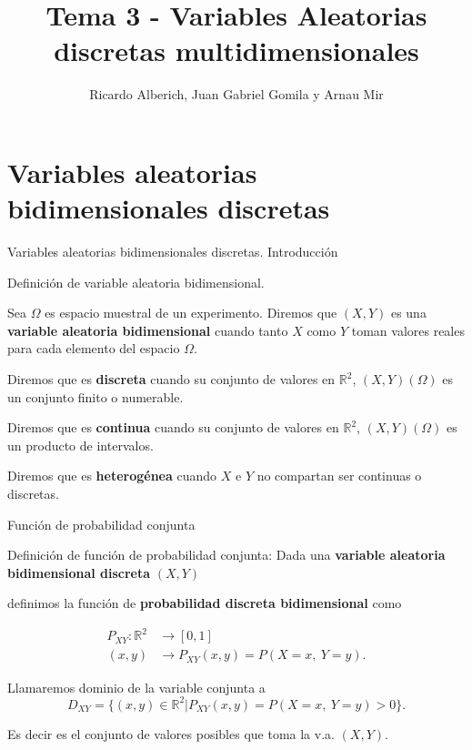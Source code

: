 \documentclass[ignorenonframetext,]{beamer}
\title{Tema 3 - Variables Aleatorias discretas multidimensionales}
\author{Ricardo Alberich, Juan Gabriel Gomila y Arnau Mir}
\date{}
\begin{document}
\frame{\titlepage}

\hypertarget{variables-aleatorias-bidimensionales-discretas}{%
\section{Variables aleatorias bidimensionales
discretas}\label{variables-aleatorias-bidimensionales-discretas}}

\begin{frame}{Variables aleatorias bidimensionales discretas.
Introducción}
\protect\hypertarget{variables-aleatorias-bidimensionales-discretas.-introducciuxf3n}{}

 Definición de variable aleatoria bidimensional.

Sea \(\Omega\) es espacio muestral de un experimento. Diremos que
\((X,Y)\) es una \textbf{variable aleatoria bidimensional} cuando tanto
\(X\) como \(Y\) toman valores reales para cada elemento del espacio
\(\Omega\).

Diremos que es \textbf{discreta} cuando su conjunto de valores en
\(\mathbb{R}^2\), \((X,Y)(\Omega)\) es un conjunto finito o numerable.

Diremos que es \textbf{continua} cuando su conjunto de valores en
\(\mathbb{R}^2\), \((X,Y)(\Omega)\) es un producto de intervalos.

Diremos que es \textbf{heterogénea} cuando \(X\) e \(Y\) no compartan
ser continuas o discretas.

\end{frame}

\begin{frame}{Función de probabilidad conjunta}
\protect\hypertarget{funciuxf3n-de-probabilidad-conjunta}{}

Definición de función de probabilidad conjunta: Dada una
\textbf{variable aleatoria bidimensional discreta} \((X,Y)\)

definimos la función de \textbf{probabilidad discreta bidimensional}
como

\[
\begin{array}{rl}
P_{XY}: \mathbb{R}^2 & \longrightarrow [0,1]\\
(x,y) & \longrightarrow P_{XY}(x,y)=P(X= x,\ Y= y).
\end{array}
\]

Llamaremos dominio de la variable conjunta a
\[D_{XY}=\{(x,y)\in \mathbb{R}^2 | P_{XY}(x,y)=P(X= x,\ Y= y)>0\}.\]

Es decir es el conjunto de valores posibles que toma la v.a. \((X,Y)\).

\end{frame}
\end{document}

